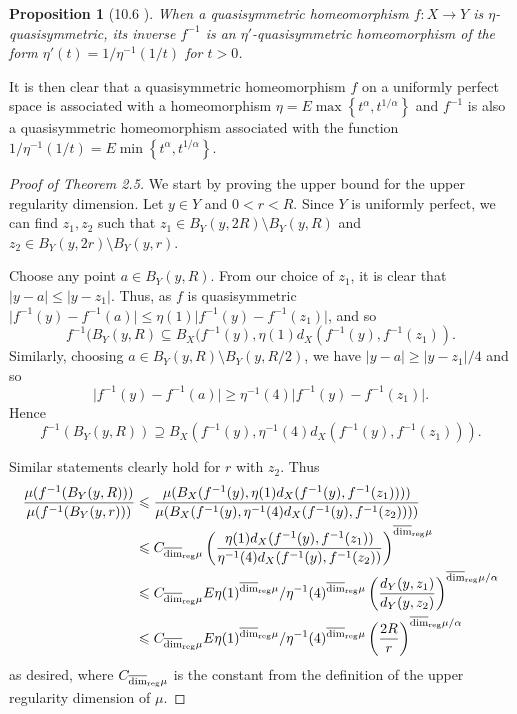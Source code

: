 \documentclass[12pt]{amsart}
\numberwithin{equation}{section}
\newtheorem{prop}[thm]{Proposition}
\renewcommand{\ge}{\geqslant}
\renewcommand{\le}{\leqslant}
\newcommand{\urdim}{\overline{\dim}_{\textup{reg}}}
\begin{document}
\begin{prop}[10.6 \cite{Heinonen}]
When a quasisymmetric homeomorphism $f\colon X \rightarrow Y$ is $\eta$-quasisymmetric, its inverse $f^{-1}$ is an $\eta'$-quasisymmetric homeomorphism of the form $\eta'(t) = 1/\eta^{-1}(1/t)$ for $t>0$.
\end{prop}

It is then clear that a quasisymmetric homeomorphism $f$ on a uniformly perfect space is associated with a homeomorphism $\eta = E\max\left\{t^\alpha, t^{1/\alpha}\right\}$ and $f^{-1}$ is also a quasisymmetric homeomorphism associated with the function $1/\eta^{-1}(1/t) = E \min\left\{t^\alpha, t^{1/\alpha} \right\}$.


\begin{proof}[Proof of Theorem 2.5]
We start by proving the upper bound for the upper regularity dimension. Let $y\in Y$ and $0<r<R$. Since $Y$ is uniformly perfect, we can find $z_1,z_2$ such that $z_1\in B_Y(y,2R) \setminus B_Y(y,R)$ and $z_2 \in B_Y(y,2r) \setminus B_Y(y,r)$. 


Choose any point $a \in B_Y(y,R)$. From our choice of $z_1$, it is clear that $\lvert y - a \rvert \le \lvert y - z_1 \rvert$. Thus, as $f$ is quasisymmetric $\lvert f^{-1}(y) - f^{-1}(a) \rvert \le \eta(1) \lvert f^{-1}(y) - f^{-1}(z_1) \rvert$, and so 
\[
f^{-1}(B_Y(y,R) \subseteq B_X(f^{-1}(y),\eta(1)d_X(f^{-1}(y), f^{-1}(z_1)).
\]
Similarly, choosing $a \in B_Y(y,R) \setminus B_Y(y,R/2)$, we have $\lvert y - a \rvert \ge \lvert y - z_1 \rvert/4$ and so $$\lvert f^{-1}(y) - f^{-1}(a) \rvert \ge \eta^{-1}(4)\lvert f^{-1}(y) - f^{-1}(z_1) \rvert.$$
Hence 
\[
f^{-1}(B_Y(y,R)) \supseteq B_X(f^{-1}(y),\eta^{-1}(4)d_X(f^{-1}(y),f^{-1}(z_1))).
\]



Similar statements clearly hold for $r$ with $z_2$. Thus
\begin{align*}
    \frac{\mu(f^{-1}(B_Y(y,R)))}{\mu(f^{-1}(B_Y(y,r)))} &\le \frac{\mu(B_X(f^{-1}(y),\eta(1)d_X(f^{-1}(y), f^{-1}(z_1)) ))}{\mu(B_X(f^{-1}(y),\eta^{-1}(4)d_X(f^{-1}(y),f^{-1}(z_2)) ))} \\
    & \le C_{\urdim \mu}\left( \frac{\eta(1)d_X(f^{-1}(y),f^{-1}(z_1))}{\eta^{-1}(4)d_X(f^{-1}(y),f^{-1}(z_2))}\right)^{\urdim \mu} \\
    & \le C_{\urdim \mu}E \eta(1)^{\urdim \mu}/\eta^{-1}(4)^{\urdim \mu} \left(\frac{d_Y(y,z_1)}{d_Y(y,z_2)} \right)^{\urdim \mu / \alpha} \\
    & \le C_{\urdim \mu}E \eta(1)^{\urdim \mu}/\eta^{-1}(4)^{\urdim \mu} \left(\frac{2R}{r} \right)^{\urdim \mu / \alpha}
\end{align*}
as desired, where $C_{\urdim \mu}$ is the constant from the definition of the upper regularity dimension of $\mu$.


\end{proof}
\end{document}
